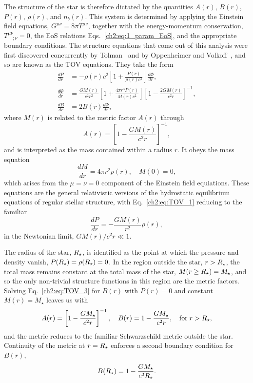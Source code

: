 The structure of the star is therefore dictated by the quantities $A(r)$, $B(r)$, $P(r)$, $\rho(r)$, and $n_b(r)$. This system is determined by applying the Einstein field equations, $G^{\mu\nu} = 8\pi T^{\mu\nu}$, together with the energy-momentum conservation, $T^{\mu\nu}_{\quad;\nu}=0$, the EoS relations Eqs.~\ref{ch2:eq:1_param_EoS}, and the appropriate boundary conditions. The structure equations that come out of this analysis were first discovered concurrently by Tolman~\cite{Tolman:1939jz_StaticSolutionsEinstein} and by Oppenheimer and Volkoff~\cite{Oppenheimer:1939ne_MassiveNeutronCores}, and so are known as the TOV equations. They take the form
\begin{align}
    \frac{dP}{dr} &= -\rho(r) c^2  \left[ 1 + \frac{P(r)}{\rho(r) c^2} \right]\frac{d\Phi}{dr},\label{ch2:eq:TOV_1}\\
    \frac{d\Phi}{dr} & = \frac{G M(r)}{c^2 r^2} \left[ 1 + \frac{4\pi r^3 P(r)}{M(r)c^2} \right] \left[ 1 - \frac{2 G M(r)}{c^2 r}\right]^{-1}\label{ch2:eq:TOV_2},\\
    \frac{dB}{dr} & = 2B(r) \frac{d\Phi}{dr},\label{ch2:eq:TOV_3}
\end{align}
where $M(r)$ is related to the metric factor $A(r)$ through
\begin{equation}
    A(r) = \left[ 1 - \frac{G M(r)}{c^2 r} \right]^{-1},
\end{equation}
and is interpreted as the mass contained within a radius $r$. It obeys the mass equation 
\begin{equation}
    \frac{dM}{dr} = 4\pi r^2 \rho(r),\quad M(0) = 0,
    \label{ch2:eq:mass_equation_TOV}
\end{equation}
which arises from the $\mu = \nu = 0$ component of the Einstein field equiations. 
These equations are the general relativistic versions of the hydrostatic equilibrium equations of regular stellar structure, with Eq.~\ref{ch2:eq:TOV_1} reducing to the familiar 
\begin{equation}
    \frac{dP}{dr} = -\frac{GM(r)}{r^2}\rho(r),
\end{equation}
in the Newtonian limit, $GM(r)/c^2 r \ll 1$.

The radius of the star, $R_\star$, is identified as the point at which the pressure and density vanish, $P(R_\star) = \rho(R_\star) = 0$. In the region outside the star, $r>R_\star$, the total mass remains constant at the total mass of the star, $M(r \geq  R_\star) = M_\star$, and so the only non-trivial structure functions in this region are the metric factors. Solving Eq.~\ref{ch2:eq:TOV_3} for $B(r)$ with $P(r)=0$ and constant $M(r) = M_\star$ leaves us with
\begin{equation}
    A(r) = \left[ 1 - \frac{G M_\star}{c^2 r} \right]^{-1}, \quad B(r) = 1 - \frac{G M_\star}{c^2 r} ,\quad\mathrm{for}\;r > R_\star,
\end{equation}
and the metric reduces to the familiar Schwarzschild metric outside the star. 
Continuity of the metric at $r= R_\star$ enforces a second boundary condition for $B(r)$,
\begin{equation}
    B(R_\star) = 1 - \frac{G M_\star}{c^2 R_\star}.
    \label{ch2:eq:B_boundary_condition}
\end{equation}

